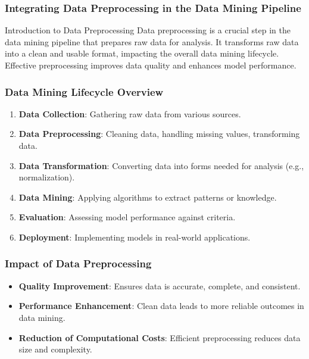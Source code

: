 \documentclass[aspectratio=169]{beamer}
\begin{document}
\begin{frame}[fragile]
    \frametitle{Integrating Data Preprocessing in the Data Mining Pipeline}
    \begin{block}{Introduction to Data Preprocessing}
        Data preprocessing is a crucial step in the data mining pipeline that prepares raw data for analysis. 
        It transforms raw data into a clean and usable format, impacting the overall data mining lifecycle.
        Effective preprocessing improves data quality and enhances model performance.
    \end{block}
\end{frame}

\begin{frame}[fragile]
    \frametitle{Data Mining Lifecycle Overview}
    \begin{enumerate}
        \item \textbf{Data Collection}: Gathering raw data from various sources.
        \item \textbf{Data Preprocessing}: Cleaning data, handling missing values, transforming data.
        \item \textbf{Data Transformation}: Converting data into forms needed for analysis (e.g., normalization).
        \item \textbf{Data Mining}: Applying algorithms to extract patterns or knowledge.
        \item \textbf{Evaluation}: Assessing model performance against criteria.
        \item \textbf{Deployment}: Implementing models in real-world applications.
    \end{enumerate}
\end{frame}

\begin{frame}[fragile]
    \frametitle{Impact of Data Preprocessing}
    \begin{itemize}
        \item \textbf{Quality Improvement}: Ensures data is accurate, complete, and consistent.
        \item \textbf{Performance Enhancement}: Clean data leads to more reliable outcomes in data mining.
        \item \textbf{Reduction of Computational Costs}: Efficient preprocessing reduces data size and complexity.
    \end{itemize}
\end{frame}
\end{document}
